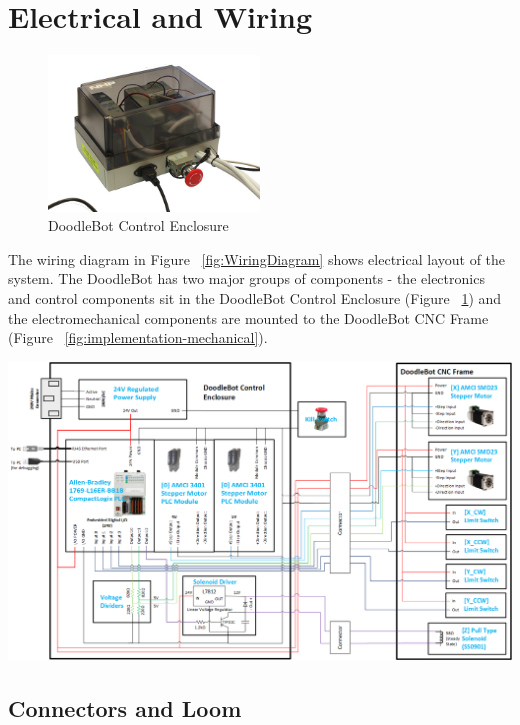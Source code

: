 \section{Electrical and Wiring}

	\begin{figure}[h]
		\centering
		\includegraphics[width=0.5\textwidth]{figures/cncMachine/control.jpg}
		\caption{DoodleBot Control Enclosure}
		\label{fig:control}
	\end{figure}
	
	The wiring diagram in Figure ~\ref{fig:WiringDiagram} shows electrical layout of the system. The DoodleBot has two major groups of components - the electronics and control components sit in the DoodleBot Control Enclosure (Figure ~\ref{fig:control}) and the electromechanical components are mounted to the DoodleBot CNC Frame (Figure ~\ref{fig:implementation-mechanical}).

	
\begin{landscape}
		\vspace*{\fill}
		\includegraphics[width=\hsize]{figures/cncMachine/wiring}
		\label{fig:WiringDiagram}
		\vspace*{\fill}
\end{landscape}


	\subsection{Connectors and Loom}
	
